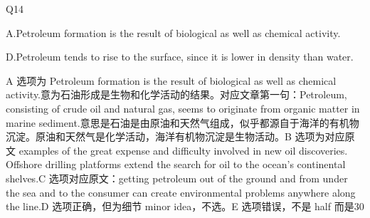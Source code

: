 \begin{blk}
    \begin{qst}
        Q14
    \end{qst}

    \begin{chc}
        A.Petroleum formation is the result of biological as well as chemical activity.

        D.Petroleum tends to rise to the surface, since it is lower in density than water.
    \end{chc}

    \begin{nlz}
        A 选项为 Petroleum formation is the result of biological as well as chemical activity.意为石油形成是生物和化学活动的结果。对应文章第一句：Petroleum, consisting of crude oil and natural gas, seems to originate from organic matter in marine sediment.意思是石油是由原油和天然气组成，似乎都源自于海洋的有机物沉淀。原油和天然气是化学活动，海洋有机物沉淀是生物活动。B 选项为对应原文 examples of the great expense and difficulty involved in new oil discoveries. Offshore drilling platforms extend the search for oil to the ocean’s continental shelves.C 选项对应原文：getting petroleum out of the ground and from under the sea and to the consumer can create environmental problems anywhere along the line.D 选项正确，但为细节 minor idea，不选。E 选项错误，不是 half 而是30%
    \end{nlz}
\end{blk}


